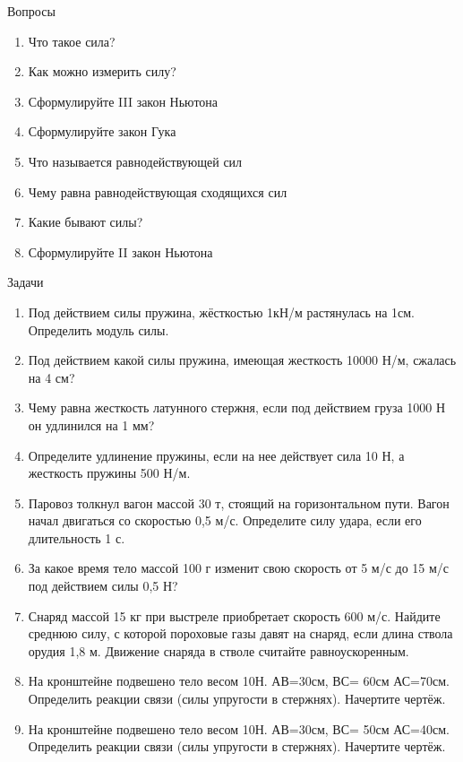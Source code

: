 \documentclass[a6paper, 11pt]{diss_4}
\renewcommand{\'}{\,'}
\begin{document}
\begin{center}
   Вопросы
\end{center}
\begin{enumerate}
\item Что такое сила?
\item Как можно измерить силу?
\item Сформулируйте III закон Ньютона
\item Сформулируйте закон Гука
\item Что называется равнодействующей сил
\item Чему равна равнодействующая сходящихся сил
\item Какие бывают силы?
\item Сформулируйте II закон Ньютона
\end{enumerate}

\begin{center}
   Задачи
\end{center}
\begin{enumerate}
\item Под действием силы пружина, жёсткостью 1кН/м растянулась на 1см. Определить модуль силы.
\item Под действием какой силы пружина, имеющая жесткость 10000 Н/м, сжалась на 4 см?
\item Чему равна жесткость латунного стержня, если под действием груза 1000 Н он удлинился на 1 мм?
\item Определите удлинение пружины, если на нее действует сила 10 Н, а жесткость пружины 500 Н/м.
\item Паровоз толкнул вагон массой 30 т, стоящий на горизонтальном пути. Вагон начал двигаться со скоростью 0,5 м/с. Определите силу удара, если его длительность 1 с.
\item За какое время тело массой 100 г изменит свою скорость от 5 м/с до 15 м/с под действием силы 0,5 Н?
\item Снаряд массой 15 кг при выстреле приобретает скорость 600 м/с. Найдите среднюю силу, с которой пороховые газы давят на снаряд, если длина ствола орудия 1,8 м. Движение снаряда в стволе считайте равноускоренным.
\item На кронштейне подвешено тело весом 10Н. АВ=30см, ВС= 60см АС=70см. Определить реакции связи (силы упругости в стержнях). Начертите чертёж.
\item На кронштейне подвешено тело весом 10Н. АВ=30см, ВС= 50см АС=40см. Определить реакции связи (силы упругости в стержнях). Начертите чертёж.
\end{enumerate}
\end{document}
